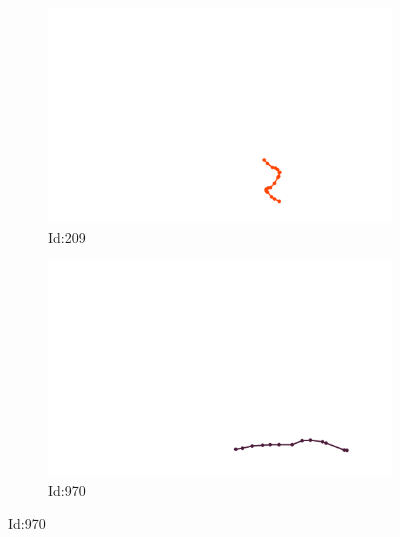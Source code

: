 \documentclass[12pt,twoside]{report}
\begin{document}
\begin{figure}
\centering
\begin{subfigure}[b]{0.20\textwidth}
\centering
\includegraphics[width=\textwidth]{../../trajectories/209.png}
\caption{Id:209}
\end{subfigure}
\begin{subfigure}[b]{0.20\textwidth}
\centering
\includegraphics[width=\textwidth]{../../trajectories/970.png}
\caption{Id:970}
\end{subfigure}
\end{figure}
\end{document}
